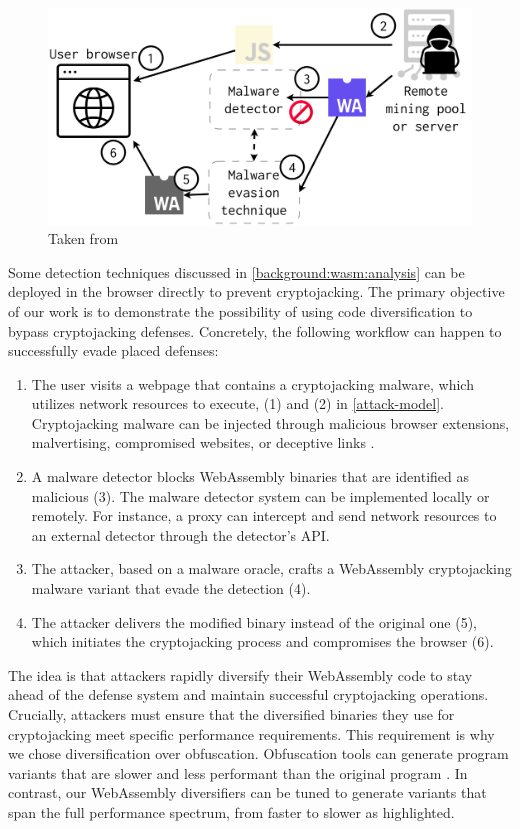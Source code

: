 \begin{figure}
    \centering
    \includegraphics[width=0.8\linewidth]{figures/threat_model.pdf}
    \caption{Taken from \cite{EVASION}}
    \label{fig:threat_model}
\end{figure}

Some detection techniques discussed in \autoref{background:wasm:analysis} can be  deployed in the browser directly to prevent cryptojacking.
The primary objective of our work is to demonstrate the possibility of using code diversification to bypass cryptojacking defenses. 
Concretely, the following workflow can happen to successfully evade placed defenses:

\begin{enumerate}
    
    \item The user visits a webpage that contains a cryptojacking malware, which utilizes network resources to execute, (1) and (2) in \autoref{attack-model}. Cryptojacking malware can be injected through malicious browser extensions, malvertising, compromised websites, or deceptive links \cite{9566204}. 
    \item A malware detector blocks WebAssembly binaries that are identified as malicious (3). The malware detector system can be implemented locally or remotely. For instance, a proxy can intercept and send network resources to an external detector through the detector's API. 
    \item The attacker, based on a malware oracle, crafts a WebAssembly cryptojacking malware variant that evade the detection (4). 
    \item The attacker delivers the modified binary instead of the original one (5), which initiates the cryptojacking process and compromises the browser (6).
\end{enumerate}


The idea is that attackers rapidly diversify their WebAssembly code to stay ahead of the defense system and maintain successful cryptojacking operations. 
Crucially, attackers must ensure that the diversified binaries they use for cryptojacking meet specific performance requirements.
This requirement is why we chose diversification over obfuscation.  
Obfuscation tools can generate program variants that are slower and less performant than the original program \cite{HOSSEINZADEH201872}.  
In contrast, our WebAssembly diversifiers can be tuned to generate variants that span the full performance spectrum, from faster to slower as highlighted.

